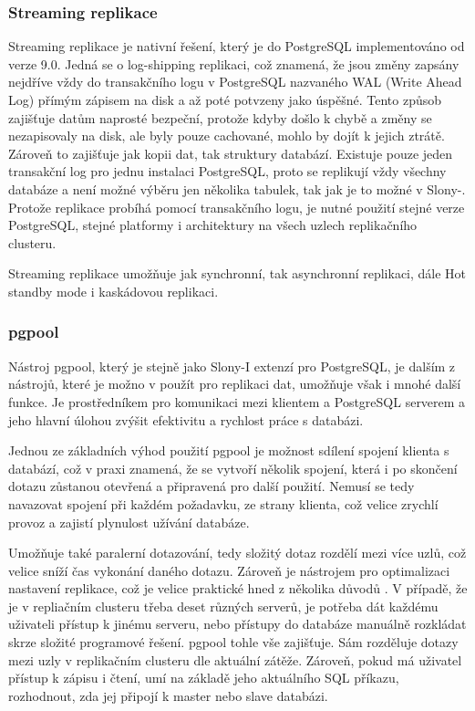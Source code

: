 \subsubsection{Streaming replikace}
\label{Streaming}

Streaming replikace je nativní řešení, který je do PostgreSQL implementováno od verze 9.0. Jedná se o log-shipping replikaci, což znamená, že jsou změny zapsány nejdříve vždy do transakčního logu v PostgreSQL nazvaného WAL (Write Ahead Log) přímým zápisem na disk a až poté potvzeny jako úspěšné. Tento způsob zajišťuje datům naprosté bezpeční, protože kdyby došlo k chybě a změny se nezapisovaly na disk, ale byly pouze cachované, mohlo by dojít k jejich ztrátě. Zároveň to zajišťuje jak kopii dat, tak struktury databází. Existuje pouze jeden transakční log pro jednu instalaci PostgreSQL, proto se replikují vždy všechny databáze a není možné výběru jen několika tabulek, tak jak je to možné v Slony-. Protože replikace probíhá pomocí transakčního logu, je nutné použití stejné verze PostgreSQL, stejné platformy i architektury na všech uzlech replikačního clusteru. 

Streaming replikace umožňuje jak synchronní, tak asynchronní replikaci, dále Hot standby mode i kaskádovou replikaci.

\subsubsection{pgpool}
\label{pgpool}
Nástroj pgpool, který je stejně jako Slony-I extenzí pro PostgreSQL, je dalším z nástrojů, které je možno v použít pro replikaci dat, umožňuje však i mnohé další funkce. Je prostředníkem pro komunikaci mezi klientem a PostgreSQL serverem a jeho hlavní úlohou zvýšit efektivitu a rychlost práce s databázi. 

Jednou ze základních výhod použití pgpool je možnost sdílení spojení klienta s databází, což v praxi znamená, že se vytvoří několik spojení, která i po skončení dotazu zůstanou otevřená a připravená pro další použití. Nemusí se tedy navazovat spojení při každém požadavku, ze strany klienta, což velice zrychlí provoz a zajistí plynulost užívání databáze. 

Umožňuje také paralerní dotazování, tedy složitý dotaz rozdělí mezi více uzlů, což velice sníží čas vykonání daného dotazu. Zároveň je nástrojem pro optimalizaci nastavení replikace, což je velice praktické hned z několika důvodů \citep{pgpool2014}. V případě, že je v repliačním clusteru třeba deset různých serverů, je potřeba dát každému uživateli přístup k jinému serveru, nebo přístupy do databáze manuálně rozkládat skrze složité programové řešení. pgpool tohle vše zajišťuje. Sám rozděluje dotazy mezi uzly v replikačním clusteru dle aktuální zátěže. Zároveň, pokud má uživatel přístup k zápisu i čtení, umí na základě jeho aktuálního SQL příkazu, rozhodnout, zda jej připojí k master nebo slave databázi.

